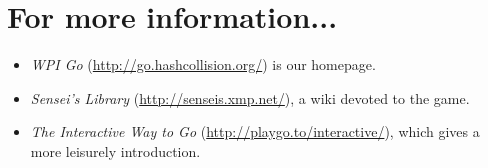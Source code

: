 \documentclass{article}
\begin{document}
\section*{For more information...}
\begin{itemize}
\item \emph{WPI Go} (\url{http://go.hashcollision.org/}) is our homepage.

\item \emph{Sensei's Library} (\url{http://senseis.xmp.net/}), a wiki
  devoted to the game.

\item \emph{The Interactive Way to Go}
  (\url{http://playgo.to/interactive/}), which gives a more leisurely
  introduction.

\end{itemize}
\end{document}
